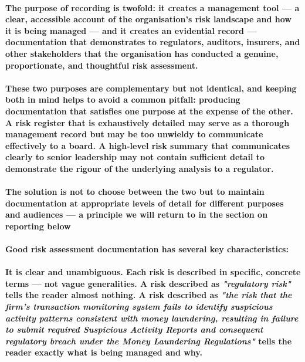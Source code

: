 \paragraph{The purpose of recording is twofold: it creates a management tool — a clear, accessible account of the organisation's risk landscape and how it is being managed — and it creates an evidential record — documentation that demonstrates to regulators, auditors, insurers, and other stakeholders that the organisation has conducted a genuine, proportionate, and thoughtful risk assessment.}
\paragraph{These two purposes are complementary but not identical, and keeping both in mind helps to avoid a common pitfall: producing documentation that satisfies one purpose at the expense of the other. A risk register that is exhaustively detailed may serve as a thorough management record but may be too unwieldy to communicate effectively to a board. A high-level risk summary that communicates clearly to senior leadership may not contain sufficient detail to demonstrate the rigour of the underlying analysis to a regulator.}
\paragraph{The solution is not to choose between the two but to maintain documentation at appropriate levels of detail for different purposes and audiences — a principle we will return to in the section on reporting below}
\paragraph{Good risk assessment documentation has several key characteristics:}
\paragraph{\textbf{It is clear and unambiguous}. Each risk is described in specific, concrete terms — not vague generalities. A risk described as \textit{"regulatory risk"} tells the reader almost nothing. A risk described as \textit{"the risk that the firm's transaction monitoring system fails to identify suspicious activity patterns consistent with money laundering, resulting in failure to submit required Suspicious Activity Reports and consequent regulatory breach under the Money Laundering Regulations"} tells the reader exactly what is being managed and why.}
